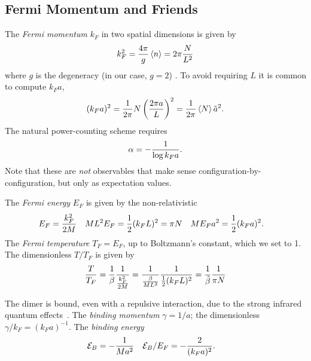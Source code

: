 \subsection{Fermi Momentum and Friends}\label{sec:kF}

The \emph{Fermi momentum} $k_F$ in two spatial dimensions is given by
\begin{align}
    k_F^2 = \frac{4\pi}{g} \left\langle n \right\rangle = 2\pi \frac{N}{L^2}
    \label{eq:kF}
\end{align}
where $g$ is the degeneracy (in our case, $g=2$) \cite{Beane:2022wcn}.
To avoid requiring $L$ it is common to compute $k_F a$,
\begin{align}
    (k_F a)^2 = \frac{1}{2\pi} N \left(\frac{2\pi a}{L}\right)^2 = \frac{1}{2\pi} \left\langle N \right\rangle \tilde{a}^2.
    \label{eq:kF a}
\end{align}
The natural power-counting scheme requires\cite{Beane:2022wcn}
\begin{align}
    \alpha = - \frac{1}{\log k_F a}.
    \label{eq:alpha}
\end{align}
Note that these are \emph{not} observables that make sense configuration-by-configuration, but only as expectation values.

The \emph{Fermi energy} $E_F$ is given by the non-relativistic
\begin{align}
    E_F &= \frac{k_F^2}{2M}
    &
    ML^2 E_F &= \frac{1}{2} (k_F L)^2 = \pi N
    &
    ME_F a^2 &= \frac{1}{2} (k_F a)^2.
\end{align}
The \emph{Fermi temperature} $T_F=E_F$, up to Boltzmann's constant, which we set to 1.
The dimensionless $T/T_F$ is given by
\begin{align}
    \frac{T}{T_F} = \frac{1}{\beta}\frac{1}{\frac{k_F^2}{2M}} = \frac{1}{\frac{\beta}{ML^2}} \frac{1}{\frac{1}{2} (k_F L)^2} = \frac{1}{\tilde{\beta}} \frac{1}{\pi N}
    \label{eq:TF}
\end{align}

The dimer is bound, even with a repulsive interaction, due to the strong infrared quantum effects~\cite{Beane:2022wcn}.
The \emph{binding momentum} $\gamma=1/a$; the dimensionless $\gamma/k_F = (k_F a)^{-1}$.
The \emph{binding energy} \binding
\begin{align}
    \mathcal{E}_B &= - \frac{1}{Ma^2}
    &
    \mathcal{E}_B / E_F &= - \frac{2}{(k_F a)^2}.
\end{align}
